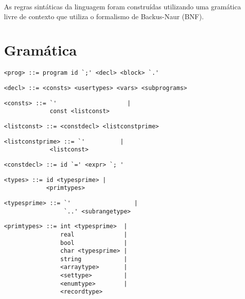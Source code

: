 As regras sintáticas da linguagem foram construídas utilizando uma gramática livre de contexto que utiliza o formalismo de Backus-Naur (BNF).

\section{Gramática}

\begin{footnotesize}
\begin{lstlisting}[frame=single, label={prog}, language=pie]
<prog> ::= program id `;' <decl> <block> `.'
\end{lstlisting}

\begin{lstlisting}[frame=single, label={decl}, language=pie]
<decl> ::= <consts> <usertypes> <vars> <subprograms>
\end{lstlisting}

\begin{lstlisting}[frame=single, label={consts}, language=pie]
<consts> ::= `'                    |
             const <listconst>
\end{lstlisting}

\begin{lstlisting}[frame=single, label={listconst}, language=pie]
<listconst> ::= <constdecl> <listconstprime>
\end{lstlisting}

\begin{lstlisting}[frame=single, label={listconstprime}, language=pie]
<listconstprime> ::= `'          |
		     <listconst>
\end{lstlisting}

\begin{lstlisting}[frame=single, label={constdecl}, language=pie]
<constdecl> ::= id `=' <expr> `; '
\end{lstlisting}

\begin{lstlisting}[frame=single, label={types}, language=pie]
<types> ::= id <typesprime> |
            <primtypes>
\end{lstlisting}

\begin{lstlisting}[frame=single, label={typesprime}, language=pie]
<typesprime> ::= `'                  |
                 `..' <subrangetype>

\end{lstlisting}

\begin{lstlisting}[frame=single, label={primtypes}, language=pie]
<primtypes> ::= int <typesprime>  |
                real              |
                bool              |
                char <typesprime> |
                string            |
                <arraytype>       |
                <settype>         |
                <enumtype>        |
                <recordtype>
\end{lstlisting}


\end{footnotesize}
